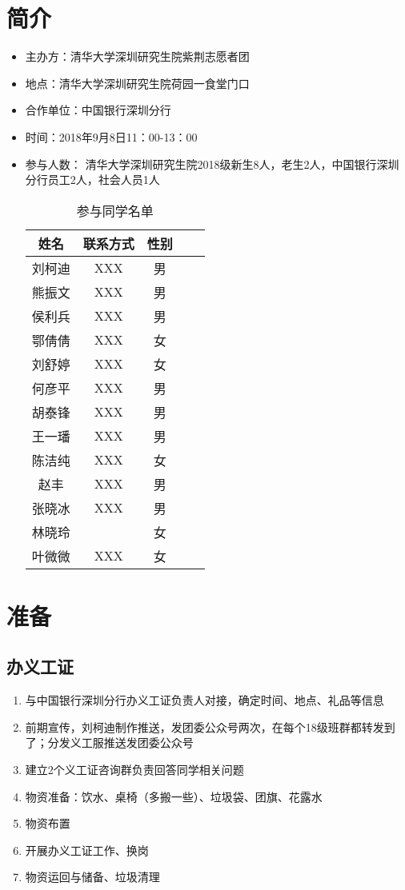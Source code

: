 \documentclass[12pt]{ctexart}
\begin{document}
\section{简介}
\begin{itemize}
\item 主办方：清华大学深圳研究生院紫荆志愿者团
\item 地点：清华大学深圳研究生院荷园一食堂门口
\item 合作单位：中国银行深圳分行
\item 时间：2018年9月8日11：00-13：00
\item 参与人数： 清华大学深圳研究生院2018级新生8人，老生2人，中国银行深圳分行员工2人，社会人员1人
\begin{table}[!ht]
\centering
\begin{tabular}{|c|c|c|c|c|}
\hline
姓名  & 联系方式 & 性别 \\
\hline
刘柯迪 & XXX  & 男\\
\hline
熊振文	& XXX & 	男 \\
\hline
侯利兵	& XXX & 	男 \\
\hline
鄂倩倩	& XXX & 女 \\
\hline
刘舒婷	& XXX & 女 \\
\hline
何彦平 & 	XXX & 男 \\
\hline
胡泰锋 & 	XXX & 男 \\
\hline
王一璠 & 	XXX	& 男 \\
\hline
陈洁纯 & XXX	& 女 \\
\hline
赵丰 	  & XXX & 男 \\
\hline
张晓冰  & XXX & 男 \\
\hline
林晓玲 &  & 女 \\
\hline
叶微微 & XXX & 女 \\
\hline
\end{tabular}
\caption{参与同学名单}
\end{table}
\end{itemize}
\section{准备}
\subsection{办义工证}
\begin{enumerate}
\item 与中国银行深圳分行办义工证负责人对接，确定时间、地点、礼品等信息
\item 前期宣传，刘柯迪制作推送，发团委公众号两次，在每个18级班群都转发到了；分发义工服推送发团委公众号
\item 建立2个义工证咨询群负责回答同学相关问题
\item 物资准备：饮水、桌椅（多搬一些）、垃圾袋、团旗、花露水
\item 物资布置
\item 开展办义工证工作、换岗
\item 物资运回与储备、垃圾清理
\end{enumerate}
\end{document}
